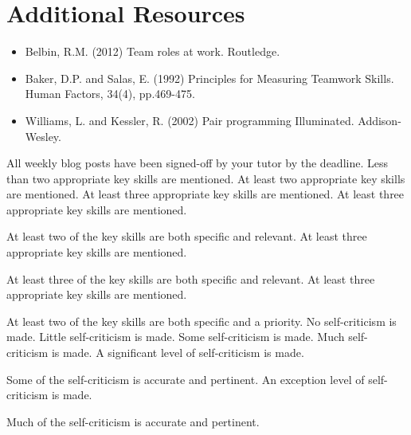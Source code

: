 \documentclass{../fal_assignment}
\begin{document}
\section*{Additional Resources}

\begin{itemize}
    \item Belbin, R.M. (2012) Team roles at work. Routledge.
    \item Baker, D.P. and Salas, E. (1992) Principles for Measuring Teamwork Skills. Human Factors, 34(4), pp.469-475.
    \item Williams, L. and Kessler, R. (2002) Pair programming Illuminated. Addison-Wesley.
\end{itemize}

\begin{markingrubric}
%
        \grade 		All weekly blog posts have been signed-off by your tutor by the deadline.
%
        \grade\fail 	Less than two appropriate key skills are mentioned.
        \grade 		At least two appropriate key skills are mentioned.
        \grade 		At least three appropriate key skills are mentioned.
        \grade 		At least three appropriate key skills are mentioned.
        \par 		At least two of the key skills are both specific and relevant.
        \grade 		At least three appropriate key skills are mentioned.
        \par 		At least three of the key skills are both specific and relevant.
        \grade 		At least three appropriate key skills are mentioned.
        \par 		At least two of the key skills are both specific and a priority.
%
        \grade\fail 	No self-criticism is made.
        \grade 		Little self-criticism is made.
        \grade 		Some self-criticism is made.
        \grade 		Much self-criticism is made.
        \grade 		A significant level of self-criticism is made.
            \par 		Some of the self-criticism is accurate and pertinent.
        \grade 		An exception level of self-criticism is made.
            \par 		Much of the self-criticism is accurate and pertinent.

\end{markingrubric}
\end{document}
